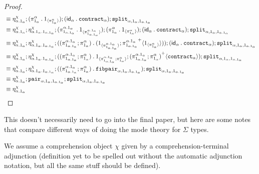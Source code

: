 \documentclass[10pt]{article}
\theoremstyle{definition}
\newcommand{\id}{\mathsf{id}}
\newcommand\bdot[0]{\mathbin{.}}
\newcommand\ApPlus[2]{\ensuremath{{#1}^+ \langle #2 \rangle }}
\begin{document}
\begin{proof}
\begin{align*}
&\equiv \eta^\chi_{\alpha.1_\alpha} ; (\pi^\alpha_{1_\alpha} \bdot \ApOne{\pi^\alpha_{1_\alpha}}) ; (\id_\alpha \bdot \contract{\alpha});\tsplit{\alpha,1_\alpha,1_{\alpha.1_\alpha}} \\
&\equiv \eta^\chi_{\alpha.1_\alpha} ;  \eta^\chi_{\alpha.1_\alpha.1_{\alpha.1_\alpha}} ; (\pi^{\alpha.1_\alpha}_{1_{\alpha.1_\alpha}} \bdot \ApOne{\pi^{\alpha.1_\alpha}_{1_{\alpha.1_\alpha}}}) ; (\pi^\alpha_{1_\alpha} \bdot \ApOne{\pi^\alpha_{1_\alpha}}) ; (\id_\alpha \bdot \contract{\alpha});\tsplit{\alpha,1_\alpha,1_{\alpha.1_\alpha}} \\
&\equiv \eta^\chi_{\alpha.1_\alpha} ;  \eta^\chi_{\alpha.1_\alpha.1_{\alpha.1_\alpha}} ; ((\pi^{\alpha.1_\alpha}_{1_{\alpha.1_\alpha}};\pi^\alpha_{1_\alpha}) \bdot (\ApOne{\pi^{\alpha.1_\alpha}_{1_{\alpha.1_\alpha}}};\ApPlus{\pi^{\alpha.1_\alpha}_{1_{\alpha.1_\alpha}}}{\ApOne{\pi^\alpha_{1_\alpha}}})) ; (\id_\alpha \bdot \contract{\alpha});\tsplit{\alpha,1_\alpha,1_{\alpha.1_\alpha}} \\
&\equiv \eta^\chi_{\alpha.1_\alpha};\eta^\chi_{\alpha.1_\alpha.1_{\alpha.1_\alpha}};((\pi^{\alpha.1_\alpha}_{1_{\alpha.1_\alpha}};\pi^\alpha_{1_\alpha}) \bdot \ApOne{\pi^{\alpha.1_\alpha}_{1_{\alpha.1_\alpha}};\pi^\alpha_{1_\alpha}};\ApPlus{(\pi^{\alpha.1_\alpha}_{1_{\alpha.1_\alpha}};\pi^\alpha_{1_\alpha})}{\contract{\alpha}});\tsplit{\alpha,1_\alpha,1_{\alpha.1_\alpha}} \\
&\equiv \eta^\chi_{\alpha.1_\alpha};\eta^\chi_{\alpha.1_\alpha.1_{\alpha.1_\alpha}};((\pi^{\alpha.1_\alpha}_{1_{\alpha.1_\alpha}};\pi^\alpha_{1_\alpha}) \bdot \fibpair{\alpha,1_\alpha,1_{\alpha.1_\alpha}});\tsplit{\alpha,1_\alpha,1_{\alpha.1_\alpha}} \\
&\equiv \eta^\chi_{\alpha.1_\alpha};\pair{\alpha,1_\alpha,1_{\alpha.1_\alpha}};\tsplit{\alpha,1_\alpha,1_{\alpha.1_\alpha}} \\
&\equiv \eta^\chi_{\alpha.1_\alpha}
\end{align*}
\end{proof}


This doesn't necessarily need to go into the final paper, but here are
some notes that compare different ways of doing the mode theory for
$\Sigma$ types.

We assume a comprehension object $\chi$ given by a
comprehension-terminal adjunction (definition yet to be spelled out
without the automatic adjunction notation, but all the same stuff should
be defined).
\end{document}
